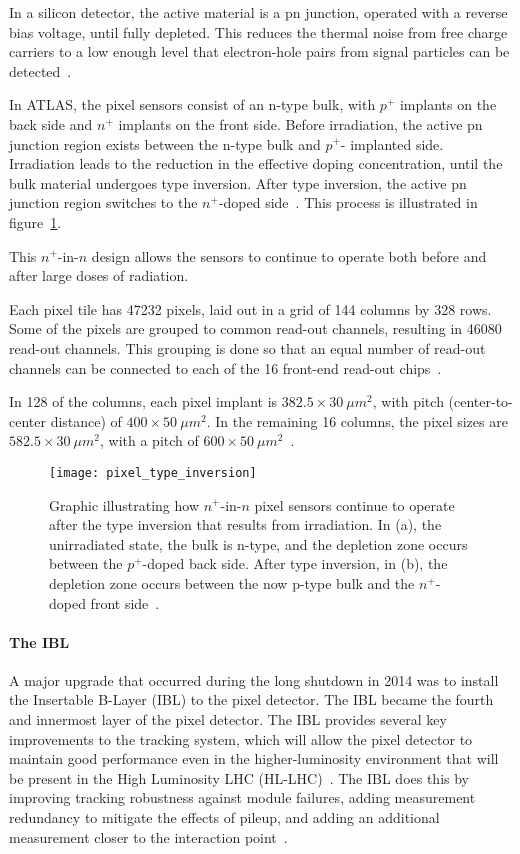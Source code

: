 In a silicon detector, the active material is a pn junction, operated with a reverse bias voltage,
until fully depleted.
This reduces the thermal noise from free charge carriers to a low enough level that electron-hole pairs
from signal particles can be detected~\cite{spieler-2005}.

In ATLAS, the pixel sensors consist of an n-type bulk, with $p^+$ implants on the back side and $n^+$ implants on the front side.
Before irradiation, the active pn junction region exists between the n-type bulk and $p^+$- implanted side.
Irradiation leads to the reduction in the effective doping concentration,
until the bulk material undergoes type inversion.
After type inversion, the active pn junction region switches to the $n^+$-doped side~\cite{pixels-2008}.
This process is illustrated in figure~\ref{fig:pixel_type_inversion}.

This $n^+$-in-$n$ design allows the sensors to continue to operate both before and after large doses of radiation.

Each pixel tile has 47232 pixels, laid out in a grid of 144 columns by 328 rows.
Some of the pixels are grouped to common read-out channels, resulting in 46080 read-out channels.
This grouping is done so that an equal number of read-out channels can be connected to each of
the 16 front-end read-out chips~\cite{pixels-2008}.

In 128 of the columns, each pixel implant is $382.5\times30~\mu m^2$, with pitch (center-to-center distance) of  $400\times50~\mu m^2$.
In the remaining 16 columns, the pixel sizes are $582.5\times30~\mu m^2$, with a pitch of  $600\times50~\mu m^2$~\cite{pixels-2008}.

\begin{figure}[!ht]\centering
\texttt{[image: pixel\_type\_inversion]}
\caption{Graphic illustrating how $n^+$-in-$n$ pixel sensors continue to operate after the type inversion that results from irradiation.
In (a), the unirradiated state, the bulk is n-type, and the depletion zone occurs between the $p^+$-doped back side.
After type inversion, in (b), the depletion zone occurs between the now p-type bulk and the $n^+$-doped front side~\cite{pixels-2008}.}
\label{fig:pixel_type_inversion}
\end{figure}

\paragraph{The IBL}
A major upgrade that occurred during the long shutdown in 2014 was to install the Insertable B-Layer (IBL) to the pixel detector.
The IBL became the fourth and innermost layer of the pixel detector.
The IBL provides several key improvements to the tracking system, which will allow the pixel detector to maintain
good performance even in the higher-luminosity environment that will be present in the High Luminosity LHC (HL-LHC)~\cite{ibl-tdr}.
The IBL does this by improving tracking robustness against module failures,
adding measurement redundancy to mitigate the effects of pileup,
and adding an additional measurement closer to the interaction point~\cite{ibl-tdr}.

